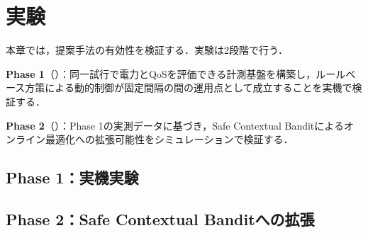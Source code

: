 \chapter{実験}
\label{ch:experiments}
\clearpage

本章では，提案手法の有効性を検証する．実験は2段階で行う．

\textbf{Phase 1}（）：同一試行で電力とQoSを評価できる計測基盤を構築し，ルールベース方策による動的制御が固定間隔の間の運用点として成立することを実機で検証する．

\textbf{Phase 2}（）：Phase 1の実測データに基づき，Safe Contextual Banditによるオンライン最適化への拡張可能性をシミュレーションで検証する．

\section{Phase 1：実機実験}
\label{sec:phase1_experiments}









\section{Phase 2：Safe Contextual Banditへの拡張}
\label{sec:phase2_experiments}





